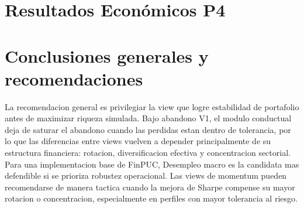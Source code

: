 \documentclass[11pt]{article}
\begin{document}
\section{Resultados Económicos P4}
\begin{table}[H]
\centering
{}
\caption{Sintesis economica por view bajo abandono V1.}
\label{tab:comparativo_v1_p4}
\end{table}

\section{Conclusiones generales y recomendaciones}
La recomendacion general es privilegiar la view que logre estabilidad de portafolio antes de maximizar riqueza simulada. Bajo abandono V1, el modulo conductual deja de saturar el abandono cuando las perdidas estan dentro de tolerancia, por lo que las diferencias entre views vuelven a depender principalmente de su estructura financiera: rotacion, diversificacion efectiva y concentracion sectorial.
Para una implementacion base de FinPUC, Desempleo macro es la candidata mas defendible si se prioriza robustez operacional. Las views de momentum pueden recomendarse de manera tactica cuando la mejora de Sharpe compense su mayor rotacion o concentracion, especialmente en perfiles con mayor tolerancia al riesgo.
\end{document}
